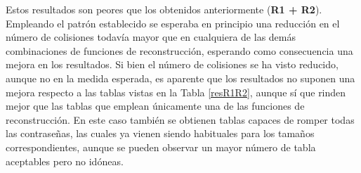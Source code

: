 \documentclass[12pt,spanish,listoffigures,listoftables]{tfgetsinf}
\begin{document}
\def\arraystretch{1.5}
\begin{table}[H]
	\LARGE
	\centering
	\caption{Porcentajes de éxito para las tablas empleando el patrón grande}
	\label{resPG}
\end{table}

Estos resultados son peores que los obtenidos anteriormente (\textbf{R1 + R2}). Empleando el patrón establecido se esperaba en principio una reducción en el número de colisiones todavía mayor que en cualquiera de las demás combinaciones de funciones de reconstrucción, esperando como consecuencia una mejora en los resultados. Si bien el número de colisiones se ha visto reducido, aunque no en la medida esperada, es aparente que los resultados no suponen una mejora respecto a las tablas vistas en la Tabla \ref{resR1R2}, aunque sí que rinden mejor que las tablas que emplean únicamente una de las funciones de reconstrucción. En este caso también se obtienen tablas capaces de romper todas las contraseñas, las cuales ya vienen siendo habituales para los tamaños correspondientes, aunque se pueden observar un mayor número de tabla aceptables pero no idóneas.
\end{document}
